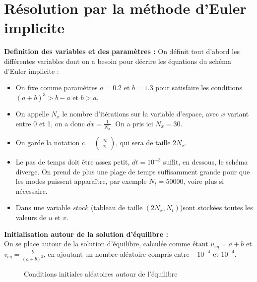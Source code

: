 \documentclass[12pt,a4paper]{article}
\begin{document}
\section{R\'esolution par la m\'ethode d'Euler implicite}
\textbf{Definition des variables et des param\`etres : }
On d\'efinit tout d'abord les diff\'erentes variables dont on a besoin pour d\'ecrire les \'equations du sch\'ema d'Euler implicite : \\
\begin{itemize}
	\item On fixe comme param\`etres $a = 0.2$ et $b = 1.3$ pour satisfaire les conditions $(a+b)^3>b-a$ et $b>a$.\\

	\item On appelle $N_x$ le nombre d'it\'erations sur la variable d'espace, avec $x$ variant entre 0 et 1, on a donc $dx = \frac{1}{N_x}$. On a pris ici $N_x = 30$.\\

	\item On garde la notation $c = \begin{pmatrix} u \\ v \end{pmatrix}$, qui sera de taille $2 N_x$.\\

	\item Le pas de temps doit \^etre assez petit, $dt = 10^{-3}$ suffit, en dessous, le sch\'ema diverge. On prend de plus une plage de temps suffisamment grande pour que les modes puissent appara\^itre, par exemple $N_t = 50 000$, voire plus si n\'ecessaire.\\

	\item Dans une variable $stock$ (tableau de taille $(2N_x,N_t)$)sont stock\'ees toutes les valeurs de $u$ et $v$.\\
\end{itemize}
\textbf{Initialisation autour de la solution d'\'equilibre : }\\
On se place autour de la solution d'\'equilibre, calcul\'ee comme \'etant $u_{eq} = a+b$ et $v_{eq} = \frac{b}{(a+b)^2}$, en ajoutant un nombre al\'eatoire compris entre $-10^{-4}$ et $10^{-4}$.
\begin{figure}[h]
\caption{Conditions initiales al\'eatoires autour de l'\'equilibre}
\label{fig cond init}
\end{figure}
\\
\end{document}
